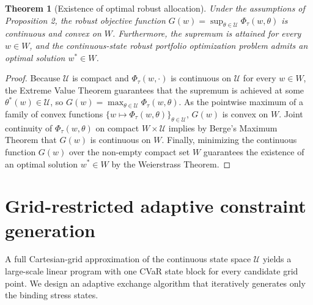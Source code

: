 \documentclass[11pt, a4paper]{article}
\newtheorem{theorem}{Theorem}
\begin{document}
\begin{theorem}[Existence of optimal robust allocation]
Under the assumptions of Proposition 2, the robust objective function $G(w) = \sup_{\theta \in \mathcal{U}} \Phi_\tau(w, \theta)$ is continuous and convex on $W$. Furthermore, the supremum is attained for every $w \in W$, and the continuous-state robust portfolio optimization problem admits an optimal solution $w^* \in W$.
\end{theorem}

\begin{proof}
Because $\mathcal{U}$ is compact and $\Phi_\tau(w, \cdot)$ is continuous on $\mathcal{U}$ for every $w \in W$, the Extreme Value Theorem guarantees that the supremum is achieved at some $\theta^*(w) \in \mathcal{U}$, so $G(w) = \max_{\theta \in \mathcal{U}} \Phi_\tau(w, \theta)$. As the pointwise maximum of a family of convex functions $\{w \mapsto \Phi_\tau(w, \theta)\}_{\theta \in \mathcal{U}}$, $G(w)$ is convex on $W$. Joint continuity of $\Phi_\tau(w, \theta)$ on compact $W \times \mathcal{U}$ implies by Berge's Maximum Theorem that $G(w)$ is continuous on $W$. Finally, minimizing the continuous function $G(w)$ over the non-empty compact set $W$ guarantees the existence of an optimal solution $w^* \in W$ by the Weierstrass Theorem.
\end{proof}

\section{Grid-restricted adaptive constraint generation}
A full Cartesian-grid approximation of the continuous state space $\mathcal{U}$ yields a large-scale linear program with one CVaR state block for every candidate grid point. We design an adaptive exchange algorithm that iteratively generates only the binding stress states.
\end{document}
